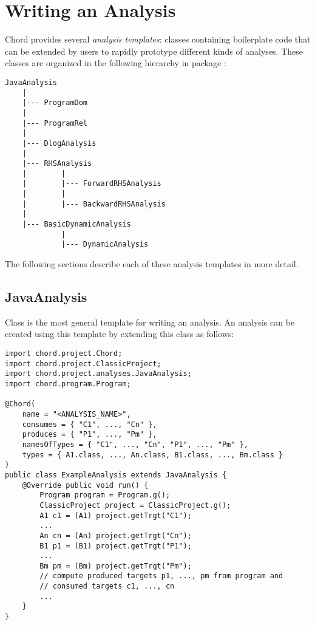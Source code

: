 \chapter{Writing an Analysis}
\label{chap:writing}

Chord provides several {\it analysis templates}: classes containing boilerplate
code that can be extended by users to rapidly prototype different kinds of
analyses.  These classes are organized in the following hierarchy in package
:

\begin{verbatim}
JavaAnalysis
    |
    |--- ProgramDom
    |
    |--- ProgramRel
    |
    |--- DlogAnalysis
    |
    |--- RHSAnalysis
    |        |
    |        |--- ForwardRHSAnalysis
    |        |
    |        |--- BackwardRHSAnalysis
    |
    |--- BasicDynamicAnalysis
             |
             |--- DynamicAnalysis
\end{verbatim}

The following sections describe each of these analysis templates in more detail.

\section{JavaAnalysis}
\label{sec:java}

Class 
is the most general template for writing an analysis.  An analysis can be
created using this template by extending this class as follows:

\begin{framed}
\begin{verbatim}
import chord.project.Chord;
import chord.project.ClassicProject;
import chord.project.analyses.JavaAnalysis;
import chord.program.Program;

@Chord(
    name = "<ANALYSIS_NAME>",
    consumes = { "C1", ..., "Cn" },
    produces = { "P1", ..., "Pm" },
    namesOfTypes = { "C1", ..., "Cn", "P1", ..., "Pm" },
    types = { A1.class, ..., An.class, B1.class, ..., Bm.class }
)
public class ExampleAnalysis extends JavaAnalysis {
    @Override public void run() {
        Program program = Program.g();
        ClassicProject project = ClassicProject.g();
        A1 c1 = (A1) project.getTrgt("C1");
        ...
        An cn = (An) project.getTrgt("Cn");
        B1 p1 = (B1) project.getTrgt("P1");
        ...
        Bm pm = (Bm) project.getTrgt("Pm");
        // compute produced targets p1, ..., pm from program and
        // consumed targets c1, ..., cn
        ...
    }
}
\end{verbatim}
\end{framed}

